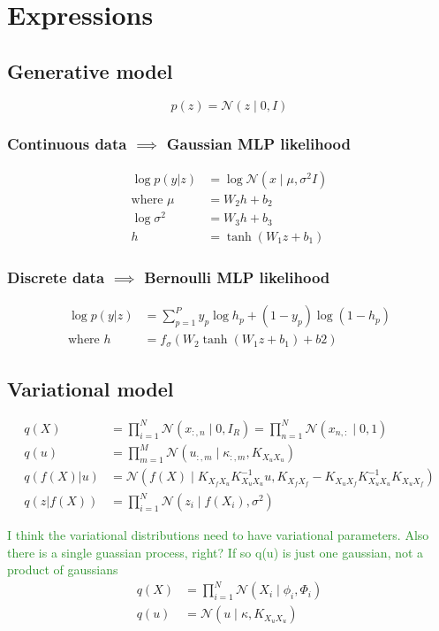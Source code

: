 \documentclass[12pt]{article}
\newcommand{\chris}[1]{\textcolor{ForestGreen}{#1}}
\newcommand{\Kff}{K_{X_fX_f}}
\newcommand{\Kuu}{K_{X_uX_u}}
\newcommand{\Kuf}{K_{X_uX_f}}
\newcommand{\Kfu}{K_{X_fX_u}}
\begin{document}
\section{Expressions}
\subsection{Generative model}
%
\begin{equation}
    p(z) = \mathcal{N}(z\mid 0, I)
\end{equation}
%
\subsubsection{Continuous data $\implies$ Gaussian MLP likelihood}
%
\begin{align}
    \log p(y|z) &= \log\mathcal{N}(x\mid \mu, \sigma^2 I)\\
    \text{where } \mu &= W_2 h + b_2\\
    \log\sigma^2 &= W_3 h + b_3\\
    h &= \tanh(W_1 z + b_1)
\end{align}
%
\subsubsection{Discrete data $\implies$ Bernoulli MLP likelihood}
%
\begin{align}
    \log p(y|z) &= \sum_{p=1}^P y_p\log h_p + (1-y_p)\log (1-h_p)\\
    \text{where } h &= f_{\sigma}(W_2 \tanh(W_1 z + b_1) + b2)
\end{align}
\subsection{Variational model}
%
\begin{align}
q(X) &= \prod_{i=1}^N \mathcal{N}(x_{:,n}\mid 0, I_R) = \prod_{n=1}^N \mathcal{N}(x_{n,:}\mid 0,1)
     \\
    q(u) &= \prod_{m=1}^M \mathcal{N}(u_{:,m}\mid \kappa_{:,m}, \Kuu)\\
    q(f(X)|u) &= \mathcal{N}(f(X)\mid \Kfu\Kuu^{-1}u, \Kff-\Kuf\Kuu^{-1}\Kuf)\\
    q(z|f(X)) &= \prod_{i=1}^N \mathcal{N}(z_i\mid f(X_i), \sigma^2)
\end{align}

\chris{I think the variational distributions need to have variational parameters. Also there is a single guassian process, right? If so q(u) is just one gaussian, not a product of gaussians}
\begin{align}
    q(X) &= \prod_{i=1}^N \mathcal{N}(X_i\mid \phi_i, \Phi_i)\\
    q(u) &= \mathcal{N}(u \mid \kappa, K_{X_uX_u})\\
\end{align}
\end{document}

